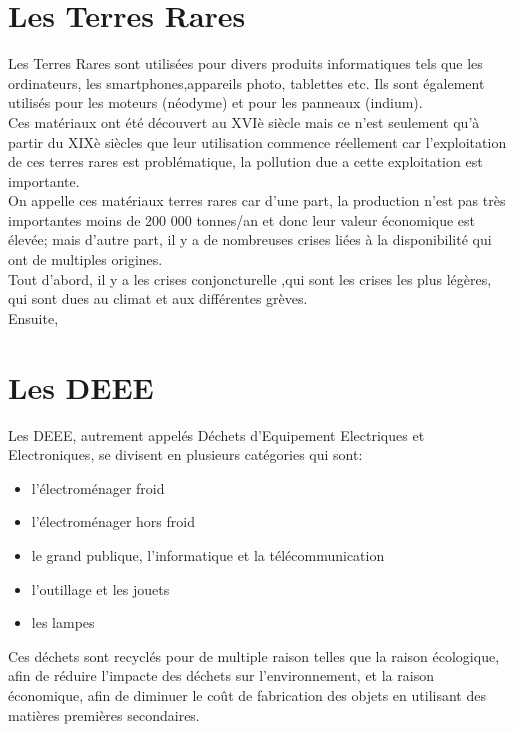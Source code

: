 \documentclass[a4paper,11pt]{report}
\begin{document}
\newpage
\section*{Les Terres Rares}

Les Terres Rares sont utilisées pour divers produits informatiques tels que les ordinateurs, les smartphones,appareils photo, tablettes etc. Ils sont également utilisés pour les moteurs (néodyme) et pour les panneaux  (indium).\\
Ces matériaux ont été découvert au XVIè siècle mais ce n'est seulement qu'à partir du XIXè siècles que leur utilisation commence réellement car l'exploitation de ces terres rares est problématique, la pollution due a cette exploitation est importante.\\
On appelle ces matériaux terres rares car d'une part, la production n'est pas très importantes moins de 200 000 tonnes/an et donc leur valeur économique est élevée; mais d'autre part, il y a de nombreuses crises liées à la disponibilité qui ont de multiples origines.\\
Tout d'abord, il y a les crises conjoncturelle ,qui sont les crises les plus légères, qui sont dues au climat et aux différentes grèves.\\
Ensuite, 


\section*{Les DEEE}

Les DEEE, autrement appelés Déchets d'Equipement Electriques et Electroniques, se divisent en plusieurs catégories qui sont:
\begin{itemize}
\item l'électroménager froid
\item l'électroménager hors froid
\item le grand publique, l'informatique et la télécommunication
\item l'outillage et les jouets
\item les lampes\\
\end{itemize}

Ces déchets sont recyclés pour de multiple raison telles que la raison écologique, afin de réduire l'impacte des déchets sur l'environnement, et la raison économique, afin de diminuer le coût de fabrication des objets en utilisant des matières premières secondaires.
\end{document}
